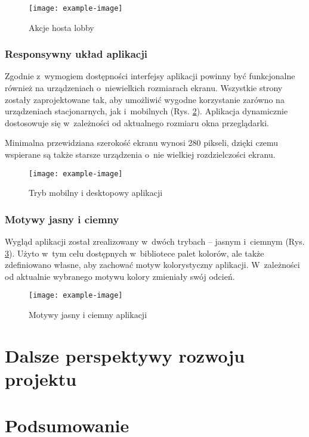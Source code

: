\begin{figure}[h!]
  \centering
  \texttt{[image: example-image]}
  \caption{Akcje hosta lobby}
  \label{fig:host_actions_ui}
\end{figure}

\FloatBarrier

\subsubsection{Responsywny układ aplikacji}

Zgodnie z~wymogiem dostępności interfejsy aplikacji powinny
być funkcjonalne również na urządzeniach o~niewielkich
rozmiarach ekranu. Wszystkie strony zostały zaprojektowane
tak, aby umożliwić wygodne korzystanie zarówno na urządzeniach
stacjonarnych, jak i~mobilnych (Rys. \ref{fig:responsive_ui}). Aplikacja dynamicznie
dostosowuje się w~zależności od aktualnego rozmiaru okna
przeglądarki.

Minimalna przewidziana
szerokość ekranu wynosi 280 pikseli, dzięki czemu wspierane
są także starsze urządzenia o~nie wielkiej rozdzielczości
ekranu.

\begin{figure}[h!]
  \centering
  \texttt{[image: example-image]}
  \caption{Tryb mobilny i desktopowy aplikacji}
  \label{fig:responsive_ui}
\end{figure}

\FloatBarrier

\subsubsection{Motywy jasny i ciemny}

Wygląd aplikacji został zrealizowany w~dwóch trybach --
jasnym i~ciemnym (Rys. \ref{fig:themes_ui}). Użyto w~tym celu dostępnych w~bibliotece
palet kolorów, ale także zdefiniowano własne, aby zachować
motyw kolorystyczny aplikacji. W~zależności od aktualnie
wybranego motywu kolory zmieniały swój odcień.

\begin{figure}[h!]
  \centering
  \texttt{[image: example-image]}
  \caption{Motywy jasny i ciemny aplikacji}
  \label{fig:themes_ui}
\end{figure}

\FloatBarrier

\section{Dalsze perspektywy rozwoju projektu}

\section{Podsumowanie}


